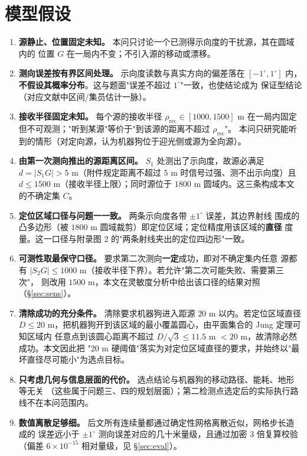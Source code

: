 \section{模型假设}

\begin{enumerate}
  \item \textbf{源静止、位置固定未知。} 本问只讨论一个已测得示向度的干扰源，其在圆域内的
        位置 $G$ 在一局内不变；不引入源的移动或漂移。
  \item \textbf{测向误差按有界区间处理。} 示向度读数与真实方向的偏差落在 $[-1^\circ,1^\circ]$
        内，\textbf{不假设其概率分布}。这与题面"误差不超过 $1^\circ$"一致，也使结论成为
        保证型结论（对应文献中区间/集员估计一脉）。
  \item \textbf{接收半径固定未知。} 每个源的接收半径 $\rho_{\mathrm{rec}}\in[1000,1500]$ m
        在一局内固定但不可观测；"听到某源"等价于"到该源的距离不超过 $\rho_{\mathrm{rec}}$"。
        本问只研究能听到的情形（对定向源，认为机器狗位于迎光侧或源为全向源）。
  \item \textbf{由第一次测向推出的源距离区间。} $S_1$ 处测出了示向度，故源必满足
        $d=|S_1G|>5$ m（附件规定距离不超过 $5$ m 时信号过强、测不出示向度）且
        $d\le1500$ m（接收半径上限）；同时源位于 $1800$ m 圆域内。这三条构成本文的不确定集 $C$。
  \item \textbf{定位区域口径与问题一一致。} 两条示向度各带 $\pm1^\circ$ 误差，其边界射线
        围成的凸多边形（被 $1800$ m 圆域裁剪）即定位区域；定位精度用该区域的\textbf{直径}
        度量。这一口径与附录图 2 的"两条射线夹出的定位四边形"一致。
  \item \textbf{可测性取最保守口径。} 要求第二次测向\textbf{一定}成功，即对不确定集内任意
        源都有 $|S_2G|\le1000$ m（接收半径下界）。若允许"第二次可能失败、需要第三次"，
        则改用 $1500$ m，本文在灵敏度分析中给出该口径的结果对照（§\ref{sec:sens}）。
  \item \textbf{清除成功的充分条件。} 清除要求机器狗进入距源 $20$ m 以内。若定位区域直径
        $D\le20$ m，把机器狗开到该区域的最小覆盖圆心，由平面集合的 Jung 定理可知区域内
        任意点到该圆心距离不超过 $D/\sqrt3\le11.5$ m $<20$ m，故清除必然成功。本文因此把
        "$20$ m 硬阈值"落实为对定位区域直径的要求，并始终以"最坏直径尽可能小"为选点目标。
  \item \textbf{只考虑几何与信息层面的代价。} 选点结论与机器狗的移动路径、能耗、地形等无关
        （这些属于问题三、四的规划层面）；第二检测点选定后的实际执行路线不在本问范围内。
  \item \textbf{数值离散足够细。} 后文所有连续量都通过确定性网格离散近似，网格步长造成的
        误差远小于 $\pm1^\circ$ 测向误差对应的几十米量级，且通过加密 $3$ 倍复算校验
        （偏差 $6\times10^{-15}$ 相对量级，见 §\ref{sec:eval}）。
\end{enumerate}
